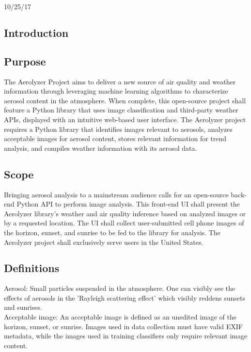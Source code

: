 \documentclass[journal,10pt,draftclsnofoot,onecolumn]{IEEEtran}
\begin{document}
\begin{titlepage}
	\vfill
	\vfill
	\vfill
	{\large10/25/17}
	\vfill
\end{titlepage}

\tableofcontents
\clearpage

\begin{singlespace}

\section{Introduction}

\subsection{Purpose}
The Aerolyzer Project aims to deliver a new source of air quality and weather information through leveraging machine learning algorithms to characterize aerosol content in the atmosphere.
When complete, this open-source project shall feature a Python library that uses image classification and third-party weather APIs, displayed with an intuitive web-based user interface.
The Aerolyzer project requires a Python library that identifies images relevant to aerosols, analyzes acceptable images for aerosol content, stores relevant information for trend analysis, and compiles weather information with its aerosol data. 

\subsection{Scope}
Bringing aerosol analysis to a mainstream audience calls for an open-source back-end Python API to perform image analysis.
This front-end UI shall present the Aerolyzer library's weather and air quality inference based on analyzed images or by a requested location.
The UI shall collect user-submitted cell phone images of the horizon, sunset, and sunrise to be fed to the library for analysis.
The Aerolyzer project shall exclusively serve users in the United States.

\subsection{Definitions}
Aerosol: Small particles suspended in the atmosphere.
One can visibly see the effects of aerosols in the 'Rayleigh scattering effect' which visibly reddens sunsets and sunrises. \\

Acceptable image: An acceptable image is defined as an unedited image of the horizon, sunset, or sunrise.
Images used in data collection must have valid EXIF metadata, while the images used in training classifiers only require relevant image content.\\


\end{singlespace}
\end{document}
